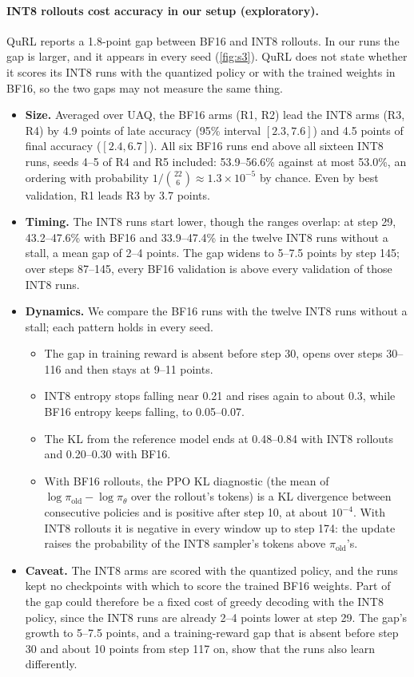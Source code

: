 \paragraph{INT8 rollouts cost accuracy in our setup (exploratory).} QuRL reports a 1.8-point gap between BF16 and INT8 rollouts. In our runs the gap is larger, and it appears in every seed (\cref{fig:s3}). QuRL does not state whether it scores its INT8 runs with the quantized policy or with the trained weights in BF16, so the two gaps may not measure the same thing.
\begin{itemize}[leftmargin=*,itemsep=2pt]
\item \textbf{Size.} Averaged over UAQ, the BF16 arms (R1, R2) lead the INT8 arms (R3, R4) by 4.9 points of late accuracy (95\% interval $[2.3, 7.6]$) and 4.5 points of final accuracy ($[2.4, 6.7]$). All six BF16 runs end above all sixteen INT8 runs, seeds 4--5 of R4 and R5 included: 53.9--56.6\% against at most 53.0\%, an ordering with probability $1/\binom{22}{6}\approx1.3\times10^{-5}$ by chance. Even by best validation, R1 leads R3 by 3.7 points.
\item \textbf{Timing.} The INT8 runs start lower, though the ranges overlap: at step 29, 43.2--47.6\% with BF16 and 33.9--47.4\% in the twelve INT8 runs without a stall, a mean gap of 2--4 points. The gap widens to 5--7.5 points by step 145; over steps 87--145, every BF16 validation is above every validation of those INT8 runs.
\item \textbf{Dynamics.} We compare the BF16 runs with the twelve INT8 runs without a stall; each pattern holds in every seed.
  \begin{itemize}[leftmargin=*,itemsep=1pt]
  \item The gap in training reward is absent before step 30, opens over steps 30--116 and then stays at 9--11 points.
  \item INT8 entropy stops falling near 0.21 and rises again to about 0.3, while BF16 entropy keeps falling, to 0.05--0.07.
  \item The KL from the reference model ends at 0.48--0.84 with INT8 rollouts and 0.20--0.30 with BF16.
  \item With BF16 rollouts, the PPO KL diagnostic (the mean of $\log\pi_{\mathrm{old}}-\log\pi_\theta$ over the rollout's tokens) is a KL divergence between consecutive policies and is positive after step 10, at about $10^{-4}$. With INT8 rollouts it is negative in every window up to step 174: the update raises the probability of the INT8 sampler's tokens above $\pi_{\mathrm{old}}$'s.
  \end{itemize}
\item \textbf{Caveat.} The INT8 arms are scored with the quantized policy, and the runs kept no checkpoints with which to score the trained BF16 weights. Part of the gap could therefore be a fixed cost of greedy decoding with the INT8 policy, since the INT8 runs are already 2--4 points lower at step 29. The gap's growth to 5--7.5 points, and a training-reward gap that is absent before step 30 and about 10 points from step 117 on, show that the runs also learn differently.
\end{itemize}

